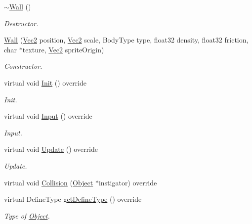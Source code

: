 \begin{DoxyCompactItemize}
\item 
\mbox{\label{class_wall_a9a2992f2b533e1c160513d1e719f920c}} 
\hyperlink{class_wall_a9a2992f2b533e1c160513d1e719f920c}{$\sim$\+Wall} ()
\begin{DoxyCompactList}\small\item\em Destructor. \end{DoxyCompactList}\item 
\mbox{\label{class_wall_a4bf1b54a7c78b0d8f474fd6bb5facbf5}} 
\hyperlink{class_wall_a4bf1b54a7c78b0d8f474fd6bb5facbf5}{Wall} (\hyperlink{struct_vec2}{Vec2} position, \hyperlink{struct_vec2}{Vec2} scale, Body\+Type type, float32 density, float32 friction, char $\ast$texture, \hyperlink{struct_vec2}{Vec2} sprite\+Origin)
\begin{DoxyCompactList}\small\item\em Constructor. \end{DoxyCompactList}\item 
\mbox{\label{class_wall_a805d3f6cd3542b644c76cda032a7e167}} 
virtual void \hyperlink{class_wall_a805d3f6cd3542b644c76cda032a7e167}{Init} () override
\begin{DoxyCompactList}\small\item\em Init. \end{DoxyCompactList}\item 
\mbox{\label{class_wall_a8e691c9f4d55ad0b2acce5a1faf1b4ae}} 
virtual void \hyperlink{class_wall_a8e691c9f4d55ad0b2acce5a1faf1b4ae}{Input} () override
\begin{DoxyCompactList}\small\item\em Input. \end{DoxyCompactList}\item 
\mbox{\label{class_wall_aca64035887ce9058e8cc71be0042d564}} 
virtual void \hyperlink{class_wall_aca64035887ce9058e8cc71be0042d564}{Update} () override
\begin{DoxyCompactList}\small\item\em Update. \end{DoxyCompactList}\item 
virtual void \hyperlink{class_wall_a5a6c81f003e285ab96119d1aa983b82d}{Collision} (\hyperlink{class_object}{Object} $\ast$instigator) override
\item 
\mbox{\label{class_wall_a6a1adf55f3ba0a2f0a878c03661eec0b}} 
virtual Define\+Type \hyperlink{class_wall_a6a1adf55f3ba0a2f0a878c03661eec0b}{get\+Define\+Type} () override
\begin{DoxyCompactList}\small\item\em Type of \hyperlink{class_object}{Object}. \end{DoxyCompactList}\end{DoxyCompactItemize}
